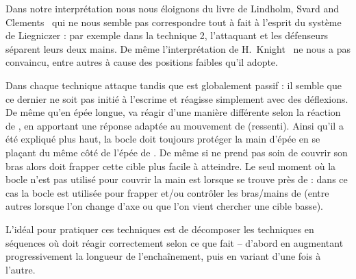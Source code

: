 Dans notre interprétation nous nous éloignons du livre de Lindholm, Svard and Clements~\cite{lindholm:ringeck_others:2006} qui ne nous semble pas correspondre tout à fait à l'esprit du système de Liegniczer : par exemple dans la technique 2, l'attaquant et les défenseurs séparent leurs deux mains.
De même l'interprétation de H.\ Knight~\cite[part I]{knight:epee_bocle} ne nous a pas convaincu, entre autres à cause des positions faibles qu'il adopte.

Dans chaque technique \A attaque tandis que \D est globalement passif : il semble que ce dernier ne soit pas initié à l'escrime et réagisse simplement avec des déflexions.
De même qu'en épée longue, \A va réagir d'une manière différente selon la réaction de \D, en apportant une réponse adaptée au mouvement de \D (ressenti).
Ainsi qu'il a été expliqué plus haut, la bocle doit toujours protéger la main d'épée en se plaçant du même côté de l'épée de \D.
De même si \D ne prend pas soin de couvrir son bras alors \A doit frapper cette cible plus facile à atteindre.
Le seul moment où la bocle n'est pas utilisé pour couvrir la main est lorsque \A se trouve près de \D : dans ce cas la bocle est utilisée pour frapper et/ou contrôler les bras/mains de \D (entre autres lorsque l'on change d'axe ou que l'on vient chercher une cible basse).

L'idéal pour pratiquer ces techniques est de décomposer les techniques en séquences où \A doit réagir correctement selon ce que fait \D – d'abord en augmentant progressivement la longueur de l'enchaînement, puis en variant d'une fois à l'autre.


